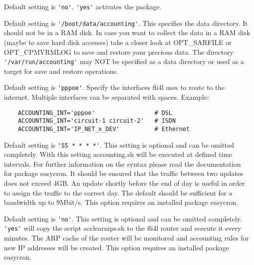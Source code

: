 \begin{description}
Default setting is \verb*?'no'?.
\verb*?'yes'? activates the package.

Default setting is \verb*?'/boot/data/accounting'?.
This specifies the data directory. It should not be in a RAM disk.
In case you want to collect the data in a RAM disk (maybe to save hard 
disk accesses) take a closer look at OPT\_SARFILE or OPT\_CPMVRMLOG 
to save and restore your precious data.\newline
The directory \verb*?'/var/run/accounting'? may NOT be specified as a 
data directory or used as a target for save and restore operations.

Default setting is \verb*?'pppoe'?.
Specify the interfaces fli4l uses to route to the internet. Multiple
interfaces can be separated with spaces.
Example:
\begin{example}
\begin{verbatim}
    ACCOUNTING_INT='pppoe'                 # DSL
    ACCOUNTING_INT='circuit-1 circuit-2'   # ISDN
    ACCOUNTING_INT='IP_NET_x_DEV'          # Ethernet
\end{verbatim}
\end{example}

Default setting is \verb*?'55 * * * *'?.
This setting is optional and can be omitted completely.
With this setting accounting.sh will be executed at defined time 
intervals. For further information on the syntax please 
read the documentation for package easycron.
It should be ensured that the traffic between two updates
does not exceed 4GB. An update shortly before the end of day is useful in order
to assign the traffic to the correct day. The default should be sufficient 
for a bandwidth up to 9Mbit/s. This option requires an installed package easycron.

Default setting is \verb*?'no'?.
This setting is optional and can be omitted completely. \verb*?'yes'? will copy 
the script acclearnips.sh to the fli4l router and ececute it every 
minutes. The ARP cache of the router will be monitored and accounting 
rules for new IP addresses will be created. This option requires an 
installed package easycron. 
\end{description}

